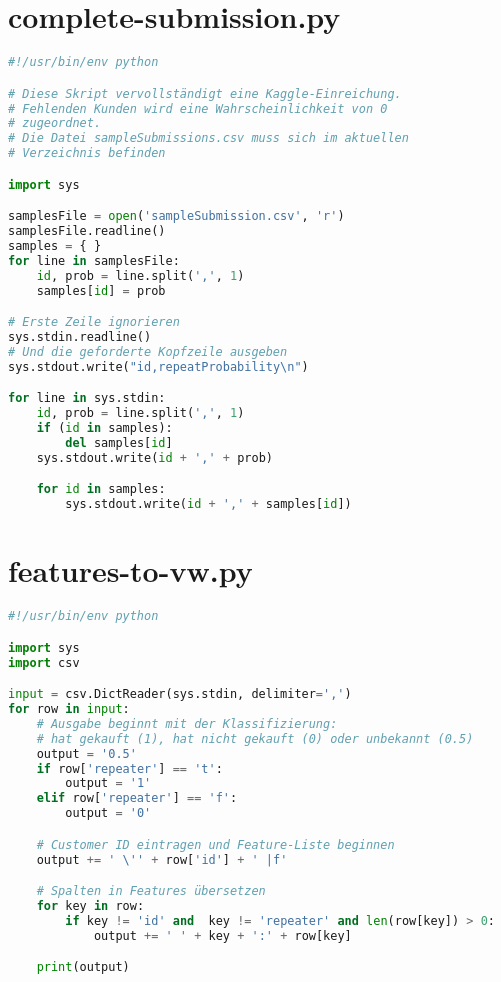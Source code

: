 \section{complete-submission.py}
\label{code:complete-submission}
\begin{lstlisting}[language=Python]
#!/usr/bin/env python

# Diese Skript vervollständigt eine Kaggle-Einreichung.
# Fehlenden Kunden wird eine Wahrscheinlichkeit von 0 
# zugeordnet.
# Die Datei sampleSubmissions.csv muss sich im aktuellen 
# Verzeichnis befinden

import sys

samplesFile = open('sampleSubmission.csv', 'r')
samplesFile.readline()
samples = { }
for line in samplesFile:
	id, prob = line.split(',', 1)
	samples[id] = prob

# Erste Zeile ignorieren
sys.stdin.readline()
# Und die geforderte Kopfzeile ausgeben
sys.stdout.write("id,repeatProbability\n")

for line in sys.stdin:
	id, prob = line.split(',', 1)
	if (id in samples):
		del samples[id]
	sys.stdout.write(id + ',' + prob)

	for id in samples:
		sys.stdout.write(id + ',' + samples[id])
\end{lstlisting}

\section{features-to-vw.py}
\label{code:features-to-vw}
\begin{lstlisting}[language=Python]
#!/usr/bin/env python

import sys
import csv

input = csv.DictReader(sys.stdin, delimiter=',')
for row in input:
	# Ausgabe beginnt mit der Klassifizierung:
	# hat gekauft (1), hat nicht gekauft (0) oder unbekannt (0.5)
	output = '0.5'
	if row['repeater'] == 't':
		output = '1'
	elif row['repeater'] == 'f':
		output = '0'

	# Customer ID eintragen und Feature-Liste beginnen
	output += ' \'' + row['id'] + ' |f'

	# Spalten in Features übersetzen
	for key in row:
		if key != 'id' and  key != 'repeater' and len(row[key]) > 0:
			output += ' ' + key + ':' + row[key]

	print(output)
\end{lstlisting}

